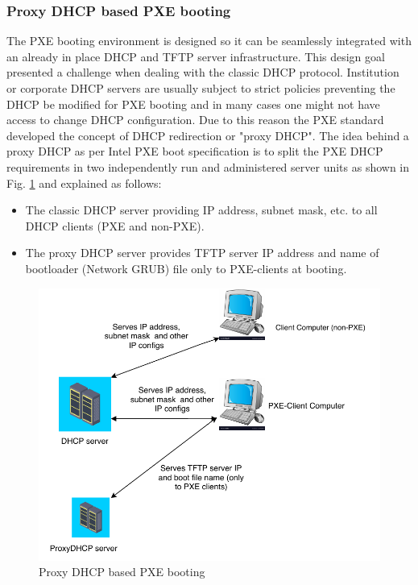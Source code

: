 \documentclass[a4paper,12pt]{article}
\begin{document}
\subsubsection{ Proxy DHCP based PXE booting}
The PXE booting environment is designed so it can be seamlessly integrated with an already in place DHCP and TFTP server infrastructure. This design goal presented a challenge when dealing with the classic DHCP protocol. Institution or corporate DHCP servers are usually subject to strict policies preventing the DHCP be modified for PXE booting and in many cases one might not have access to change DHCP configuration. Due to this reason the PXE standard developed the concept of DHCP redirection or "proxy DHCP". The idea behind a proxy DHCP as per Intel PXE boot specification \cite{pxe_intel} is to split the PXE DHCP requirements in two independently run and administered server units as shown in Fig. \ref{proxydhcp} and explained as follows:
\begin{itemize}
    \item The classic DHCP server providing IP address, subnet mask, etc. to all DHCP clients (PXE and non-PXE).
    \item The proxy DHCP server provides TFTP server IP address and name of bootloader (Network GRUB) file only to PXE-clients at booting.
\end{itemize}
\begin{figure}
    \centering
    \includegraphics[width=\linewidth]{proxydhcp.pdf}
    \caption{Proxy DHCP based PXE booting}
    \label{proxydhcp}
\end{figure}
\end{document}
